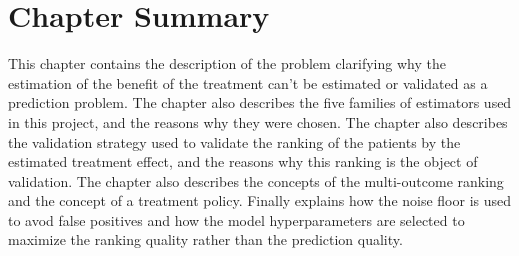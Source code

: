 \section{Chapter Summary}
This chapter contains the description of the problem clarifying why the estimation of the
benefit of the treatment can't be estimated or validated as a prediction problem.
The chapter also describes the five families of estimators used in this project, and the reasons
why they were chosen. The chapter also describes the validation strategy used to validate the ranking of the
patients by the estimated treatment effect, and the reasons why this ranking is the object of validation.
The chapter also describes the concepts of the multi-outcome ranking and the concept of a treatment policy.
Finally explains how the noise floor is used to avod false positives and how the model hyperparameters are
selected to maximize the ranking quality rather than the prediction quality.
